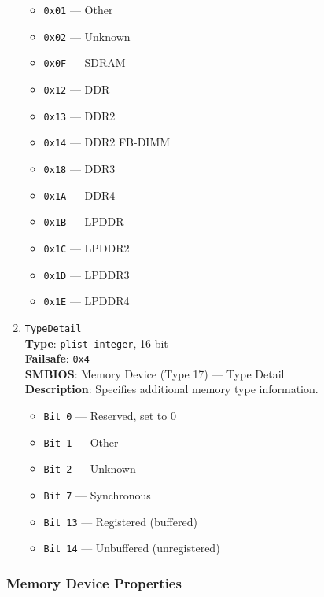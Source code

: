 \documentclass[]{article}
\providecommand{\tightlist}{%
  \setlength{\itemsep}{0pt}\setlength{\parskip}{0pt}}
\begin{document}
\begin{enumerate}
  \begin{itemize}
  \tightlist
  \item
    \texttt{0x01} --- Other
  \item
    \texttt{0x02} --- Unknown
  \item
    \texttt{0x0F} --- SDRAM
  \item
    \texttt{0x12} --- DDR
  \item
    \texttt{0x13} --- DDR2
  \item
    \texttt{0x14} --- DDR2 FB-DIMM
  \item
    \texttt{0x18} --- DDR3
  \item
    \texttt{0x1A} --- DDR4
  \item
    \texttt{0x1B} --- LPDDR
  \item
    \texttt{0x1C} --- LPDDR2
  \item
    \texttt{0x1D} --- LPDDR3
  \item
    \texttt{0x1E} --- LPDDR4
  \end{itemize}

\item
  \texttt{TypeDetail}\\
  \textbf{Type}: \texttt{plist\ integer}, 16-bit\\
  \textbf{Failsafe}: \texttt{0x4}\\
  \textbf{SMBIOS}: Memory Device (Type 17) --- Type Detail\\
  \textbf{Description}: Specifies additional memory type information.

  \begin{itemize}
  \tightlist
  \item
    \texttt{Bit 0} --- Reserved, set to 0
  \item
    \texttt{Bit 1} --- Other
  \item
    \texttt{Bit 2} --- Unknown
  \item
    \texttt{Bit 7} --- Synchronous
  \item
    \texttt{Bit 13} --- Registered (buffered)
  \item
    \texttt{Bit 14} --- Unbuffered (unregistered)
  \end{itemize}

\end{enumerate}

\subsubsection{Memory Device Properties}\label{platforminfomemorydevice}
\end{document}
